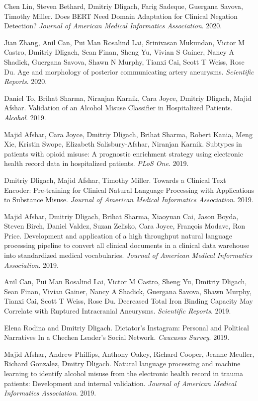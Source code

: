 \documentclass[letterpaper]{article}
\renewenvironment{itemize}{
  \begin{list}{}{
    \setlength{\leftmargin}{1.5em}
  }
}{
  \end{list}
}
\begin{document}
\begin{itemize}
\item Chen Lin, Steven Bethard, Dmitriy Dligach, Farig Sadeque, Guergana Savova, Timothy Miller. Does BERT Need Domain Adaptation for Clinical Negation Detection? \emph{Journal of American Medical Informatics Association}. 2020.
\item Jian Zhang, Anil Can, Pui Man Rosalind Lai, Srinivasan Mukundan, Victor M Castro, Dmitriy Dligach, Sean Finan, Sheng Yu, Vivian S Gainer, Nancy A Shadick, Guergana Savova, Shawn N Murphy, Tianxi Cai, Scott T Weiss, Rose Du. Age and morphology of posterior communicating artery aneurysms. \emph{Scientific Reports}. 2020.
\item Daniel To, Brihat Sharma, Niranjan Karnik, Cara Joyce, Dmitriy Dligach, Majid Afshar. Validation of an Alcohol Misuse Classifier in Hospitalized Patients. \emph{Alcohol}. 2019.
\item Majid Afshar, Cara Joyce, Dmitriy Dligach, Brihat Sharma, Robert Kania, Meng Xie, Kristin Swope, Elizabeth Salisbury-Afshar, Niranjan Karnik. Subtypes in patients with opioid misuse: A prognostic enrichment strategy using electronic health record data in hospitalized patients. \emph{PLoS One}. 2019.
\item Dmitriy Dligach, Majid Afshar, Timothy Miller. Towards a Clinical Text Encoder: Pre-training for Clinical Natural Language Processing with Applications to Substance Misuse. \emph{Journal of American Medical Informatics Association}. 2019.
\item  Majid Afshar, Dmitriy Dligach, Brihat Sharma, Xiaoyuan Cai, Jason Boyda, Steven Birch, Daniel Valdez, Suzan Zelisko, Cara Joyce, François Modave, Ron Price. Development and application of a high throughput natural language processing pipeline to convert all clinical documents in a clinical data warehouse into standardized medical vocabularies. \emph{Journal of American Medical Informatics Association}. 2019.
\item Anil Can, Pui Man Rosalind Lai, Victor M Castro, Sheng Yu, Dmitriy Dligach, Sean Finan, Vivian Gainer, Nancy A Shadick, Guergana Savova, Shawn Murphy, Tianxi Cai, Scott T Weiss, Rose Du. Decreased Total Iron Binding Capacity May Correlate with Ruptured Intracranial Aneurysms. \emph{Scientific Reports}. 2019.
\item Elena Rodina and Dmitriy Dligach. Dictator's Instagram: Personal and Political Narratives In a Chechen Leader's Social Network. \emph{Caucasus Survey}. 2019.
\item Majid Afshar, Andrew Phillips, Anthony Oakey, Richard Cooper, Jeanne Meuller, Richard Gonzalez, Dmitry Dligach. Natural language processing and machine learning to identify alcohol misuse from the electronic health record in trauma patients: Development and internal validation. \emph{Journal of American Medical Informatics Association}. 2019.

\end{itemize}
\end{document}

